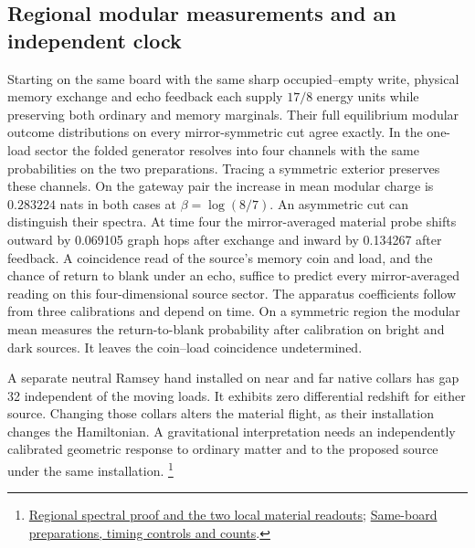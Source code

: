 \documentclass[11pt]{article}
\begin{document}
\subsection{Regional modular measurements and an independent clock}

Starting on the same board with the same sharp occupied--empty write,
physical memory exchange and echo feedback each supply $17/8$ energy
units while preserving both ordinary and memory marginals. Their full
equilibrium modular outcome distributions on every mirror-symmetric cut agree exactly.
In the one-load sector the folded generator resolves into four channels
with the same probabilities on the two preparations. Tracing a symmetric
exterior preserves these channels. On the gateway pair the increase in
mean modular charge is $0.283224$ nats in both cases at
$\beta=\log(8/7)$. An asymmetric cut can distinguish their spectra.
At time four the mirror-averaged material probe shifts outward by
0.069105 graph hops after exchange and inward by 0.134267 after
feedback. A coincidence read of the source's memory coin and load, and
the chance of return to blank under an echo, suffice to predict every
mirror-averaged reading on this four-dimensional source sector. The
apparatus coefficients follow from three calibrations and depend on time.
On a symmetric region the modular mean measures the return-to-blank
probability after calibration on bright and dark sources. It leaves the
coin--load coincidence undetermined.

A separate neutral Ramsey hand installed on near and far native collars
has gap 32 independent of the moving loads. It exhibits zero differential
redshift for either source. Changing those collars alters the material
flight, as their installation changes the Hamiltonian. A gravitational
interpretation needs an independently calibrated geometric response to
ordinary matter and to the proposed source under the same installation.%
\footnote{\href{https://github.com/FloatingPragma/observer-patch-holography/tree/main/model/experiments/interval_echo_shell_flux/product_address/green_response/material_recoil/overlap_source/native_boundary/regional_reference}{Regional spectral proof and the two local material readouts};
\href{https://github.com/FloatingPragma/observer-patch-holography/tree/main/model/experiments/interval_echo_shell_flux/product_address/green_response/material_recoil/overlap_source/native_boundary/matched_probe}{Same-board preparations, timing controls and counts}.}
\end{document}
